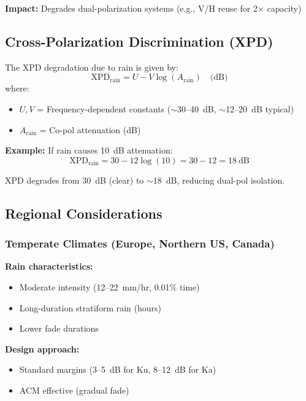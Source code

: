 \textbf{Impact:} Degrades dual-polarization systems (e.g., V/H reuse for 2$\times$ capacity)

\subsection{Cross-Polarization Discrimination (XPD)}

The XPD degradation due to rain is given by:
\begin{equation}
\text{XPD}_{\text{rain}} = U - V \log(A_{\text{rain}}) \quad \text{(dB)}
\end{equation}
where:
\begin{itemize}
\item $U, V$ = Frequency-dependent constants ($\sim$30--40~dB, $\sim$12--20~dB typical)
\item $A_{\text{rain}}$ = Co-pol attenuation (dB)
\end{itemize}

\textbf{Example:} If rain causes 10~dB attenuation:
\begin{equation}
\text{XPD}_{\text{rain}} = 30 - 12\log(10) = 30 - 12 = 18~\text{dB}
\end{equation}

XPD degrades from 30~dB (clear) to $\sim$18~dB, reducing dual-pol isolation.

\subsection{Regional Considerations}

\subsubsection{Temperate Climates (Europe, Northern US, Canada)}

\textbf{Rain characteristics:}
\begin{itemize}
\item Moderate intensity (12--22~mm/hr, 0.01\% time)
\item Long-duration stratiform rain (hours)
\item Lower fade durations
\end{itemize}

\textbf{Design approach:}
\begin{itemize}
\item Standard margins (3--5~dB for Ku, 8--12~dB for Ka)
\item ACM effective (gradual fade)
\end{itemize}


